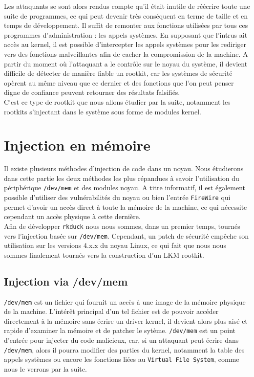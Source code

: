 \documentclass[11pt]{article}
\begin{document}
    Les attaquants se sont alors rendus compte qu'il était inutile de réécrire toute une suite de programmes, ce qui peut devenir très conséquent en terme de taille et en temps de développement. Il suffit de remonter aux fonctions utilisées par tous ces programmes d'administration : les appels systèmes. En supposant que l'intrus ait accès au kernel, il est possible d'intercepter les appels systèmes pour les rediriger vers des fonctions malveillantes afin de cacher la compromission de la machine. A partir du moment où l'attaquant a le contrôle sur le noyau du système, il devient difficile de détecter de manière fiable un rootkit, car les systèmes de sécurité opèrent au même niveau que ce dernier et des fonctions que l'on peut penser digne de confiance peuvent retourner des résultats falsifiés. \\
    C'est ce type de rootkit que nous allons étudier par la suite, notamment les rootkits s'injectant dans le système sous forme de modules kernel.



\section{Injection en mémoire}

    Il existe plusieurs méthodes d'injection de code dans un noyau. Nous étudierons dans cette partie les deux méthodes les plus répandues à savoir l'utilisation du périphérique \texttt{/dev/mem}\cite{devmem} et des modules noyau. A titre informatif, il est également possible d'utiliser des vulnérabilités du noyau ou bien l'entrée \texttt{FireWire} qui permet d'avoir un accès direct à toute la mémoire de la machine, ce qui nécessite cependant un accès physique à cette dernière.\\

    Afin de développer \texttt{rkduck} nous nous sommes, dans un premier temps, tournés vers l'injection basée sur \texttt{/dev/mem}. Cependant, un patch de sécurité empêche son utilisation sur les versions 4.x.x du noyau Linux, ce qui fait que nous nous sommes finalement tournés vers la construction d'un LKM rootkit.

    \subsection{Injection via /dev/mem}
    
        \texttt{/dev/mem} est un fichier qui fournit un accès à une image de la mémoire physique de la machine. L'intérêt principal d'un tel fichier est de pouvoir accéder directement à la mémoire sans écrire un driver kernel, il devient alors plus aisé et rapide d'examiner la mémoire et de patcher le sytème. \texttt{/dev/mem} est un point d'entrée pour injecter du code malicieux, car, si un attaquant peut écrire dans \texttt{/dev/mem}, alors il pourra modifier des parties du kernel, notamment la table des appels systèmes ou encore les fonctions liées au \texttt{Virtual File System}, comme nous le verrons par la suite.\\
        
\end{document}

